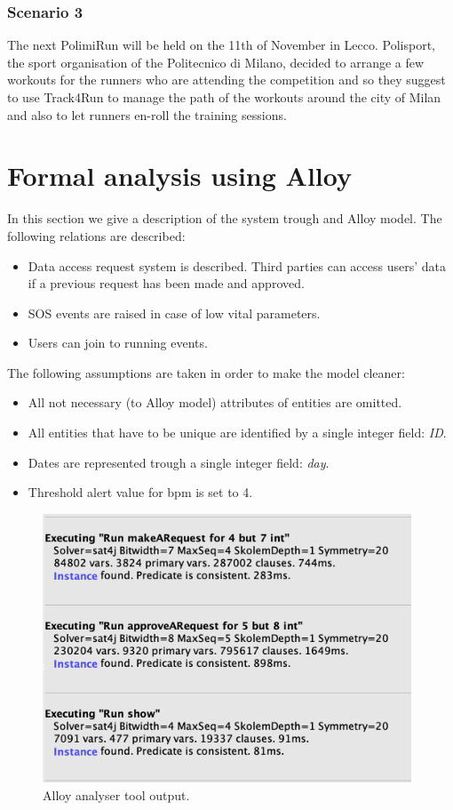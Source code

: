 \documentclass{article}
\begin{document}
	\subsubsection{Scenario 3}
	The next PolimiRun will be held on the 11th of November in Lecco.
	Polisport, the sport organisation of the Politecnico di Milano, 
	decided to arrange a few workouts for the runners who are 
	attending the competition and so they suggest to use Track4Run to
	manage the path of the workouts around the city of Milan and also
	to let runners en-roll the training sessions. 

\newpage
\section{Formal analysis using Alloy}

In this section we give a description of the system trough and Alloy model.
The following relations are described:
\begin{itemize}
	\item Data access request system is described. Third parties can access users' data
		if a previous request has been made and approved.
	\item SOS events are raised in case of low vital parameters.
	\item Users can join to running events.
\end{itemize}
The following assumptions are taken in order to make the model cleaner:
\begin{itemize}
	\item All not necessary (to Alloy model) attributes of entities are omitted.
	\item All entities that have to be unique are identified by a single integer field: \textit{ID}.
	\item Dates are represented trough a single integer field: \textit{day}.
	\item Threshold alert value for bpm is set to 4.
\end{itemize}

\newpage

\begin{figure}[!h]
	\centering
	\includegraphics[height=8cm,keepaspectratio]{Figures/AlloyPredicates}
	\caption{Alloy analyser tool output.}
\end{figure}
\newpage
\end{document}
